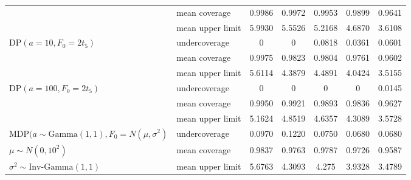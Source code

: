 \documentclass[11pt]{article}
\begin{document}
\begin{table}[htbp]
{\begin{tabular}{l l | c c c c c}
 & mean coverage  & 0.9986 & 0.9972 & 0.9953 & 0.9899 & 0.9641 \\
 & mean upper limit & 5.9930 & 5.5526 & 5.2168 & 4.6870 & 3.6108 \\
DP$(a=10,F_0 = 2t_5)$ & undercoverage & 0 & 0 & 0.0818 & 0.0361 & 0.0601 \\
 & mean coverage  & 0.9975 & 0.9823 & 0.9804 & 0.9761 & 0.9602 \\
 & mean upper limit & 5.6114 & 4.3879 & 4.4891 & 4.0424 & 3.5155 \\
DP$(a=100,F_0 = 2t_5)$
 & undercoverage & 0 & 0 & 0 & 0 & 0.0145 \\
 & mean coverage  & 0.9950 & 0.9921 & 0.9893 & 0.9836 & 0.9627 \\
 & mean upper limit & 5.1624 & 4.8519 & 4.6357 & 4.3089 & 3.5728 \\
\hline
MDP$(a\sim \text{Gamma}(1,1), F_0 = N(\mu, \sigma^2)$ 
 & undercoverage & 0.0970 & 0.1220 & 0.0750 & 0.0680 & 0.0680 \\
$\mu\sim N(0, 10^2)$ 
 & mean coverage  & 0.9837 & 0.9763 & 0.9787 & 0.9726 & 0.9587 \\
$\sigma^2\sim \text{Inv-Gamma}(1,1)$ 
 & mean upper limit & 5.6763 & 4.3093 & 4.275 & 3.9328 & 3.4789 \\
\hline
\hline
\end{tabular}
}
\end{table}
\end{document}
